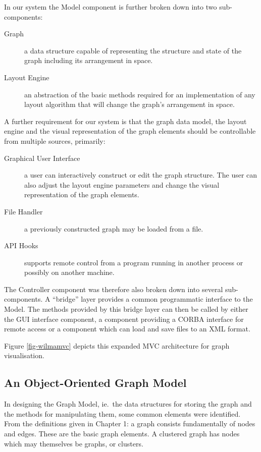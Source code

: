 \documentclass[runningheads]{cl2emult}
\begin{document}
In our system the Model component is further broken down into two sub-components:
\begin{description}
\item[Graph] a data structure capable of representing the structure
and state of the graph including its arrangement in space.
\item[Layout Engine] an abstraction of the basic methods required for
an implementation of any layout algorithm that will change the graph's
arrangement in space.
\end{description}

A further requirement for our system is that the graph data model,
the layout engine and the visual representation of the graph elements should be controllable from multiple sources, primarily:
\begin{description}
\item[Graphical User Interface] a user can interactively construct or
edit the graph structure.  The user can also adjust the layout engine parameters and change the visual representation of the graph elements.
\item[File Handler] a previously constructed graph may be loaded from a file.
\item[API Hooks] supports remote control from a program running in another process or possibly on
another machine. 
\end{description}
The Controller component was therefore also broken
down into several sub-components.  A ``bridge'' layer provides a common
programmatic interface to the Model.  The methods provided by this
bridge layer can then be called by either the GUI interface component,
a component providing a CORBA interface for remote access or a component which
can load and save files to an XML format.

Figure \ref{fig-wilmamvc} depicts this expanded MVC architecture for graph
visualisation. 

\subsection{An Object-Oriented Graph Model}
In designing the Graph Model, ie.\ the data structures for storing the
graph and the methods for manipulating them, some common
elements were identified.  From the definitions given in Chapter 
1: a graph consists fundamentally
of nodes and edges.  These are the basic graph elements.  A clustered
graph has nodes which may themselves be graphs, or clusters.
\end{document}

